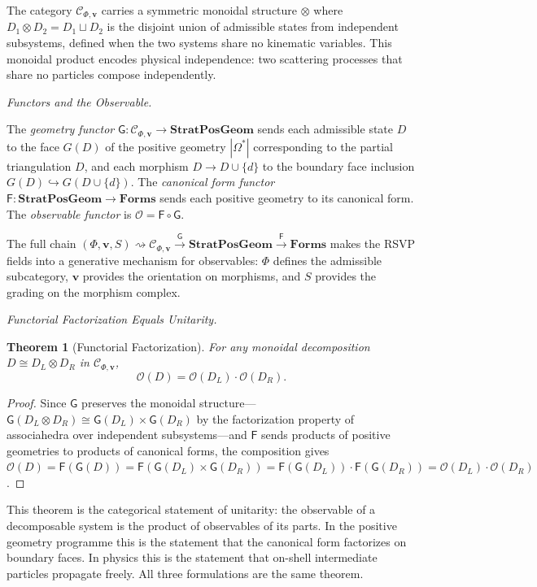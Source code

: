 \documentclass[12pt, oneside]{amsart}
\theoremstyle{plain}
\newtheorem{theorem}{Theorem}[section]
\theoremstyle{definition}
\theoremstyle{remark}
\newcommand{\Phif}{\Phi}
\newcommand{\Sf}{S}
\newcommand{\OmKS}{\Omega}
\newcommand{\SPG}{\mathbf{StratPosGeom}}
\newcommand{\Forms}{\mathbf{Forms}}
\newcommand{\Ccat}{\mathcal{C}_{\Phi,\mathbf{v}}}
\newcommand{\Gfun}{\mathsf{G}}
\newcommand{\Ffun}{\mathsf{F}}
\newcommand{\Ofun}{\mathcal{O}}
\begin{document}
The category $\Ccat$ carries a symmetric monoidal structure $\otimes$ where $D_1 \otimes D_2 = D_1 \sqcup D_2$ is the disjoint union of admissible states from independent subsystems, defined when the two systems share no kinematic variables. This monoidal product encodes physical independence: two scattering processes that share no particles compose independently.

\medskip\noindent\textit{Functors and the Observable.}

The \emph{geometry functor} $\Gfun: \Ccat \to \SPG$ sends each admissible state $D$ to the face $G(D)$ of the positive geometry $|\OmKS^*|$ corresponding to the partial triangulation $D$, and each morphism $D \to D \cup \{d\}$ to the boundary face inclusion $G(D) \hookrightarrow G(D \cup \{d\})$. The \emph{canonical form functor} $\Ffun: \SPG \to \Forms$ sends each positive geometry to its canonical form. The \emph{observable functor} is $\Ofun = \Ffun \circ \Gfun$.

The full chain $(\Phif, \mathbf{v}, \Sf) \rightsquigarrow \Ccat \xrightarrow{\Gfun} \SPG \xrightarrow{\Ffun} \Forms$ makes the RSVP fields into a generative mechanism for observables: $\Phif$ defines the admissible subcategory, $\mathbf{v}$ provides the orientation on morphisms, and $\Sf$ provides the grading on the morphism complex.

\medskip\noindent\textit{Functorial Factorization Equals Unitarity.}

\begin{theorem}[Functorial Factorization]
\label{thm:factorization}
For any monoidal decomposition $D \cong D_L \otimes D_R$ in $\Ccat$,
\[
  \Ofun(D) = \Ofun(D_L) \cdot \Ofun(D_R).
\]
\end{theorem}

\begin{proof}
Since $\Gfun$ preserves the monoidal structure---$\Gfun(D_L \otimes D_R) \cong \Gfun(D_L) \times \Gfun(D_R)$ by the factorization property of associahedra over independent subsystems---and $\Ffun$ sends products of positive geometries to products of canonical forms, the composition gives $\Ofun(D) = \Ffun(\Gfun(D)) = \Ffun(\Gfun(D_L) \times \Gfun(D_R)) = \Ffun(\Gfun(D_L)) \cdot \Ffun(\Gfun(D_R)) = \Ofun(D_L) \cdot \Ofun(D_R)$.
\end{proof}

This theorem is the categorical statement of unitarity: the observable of a decomposable system is the product of observables of its parts. In the positive geometry programme this is the statement that the canonical form factorizes on boundary faces. In physics this is the statement that on-shell intermediate particles propagate freely. All three formulations are the same theorem.
\end{document}
